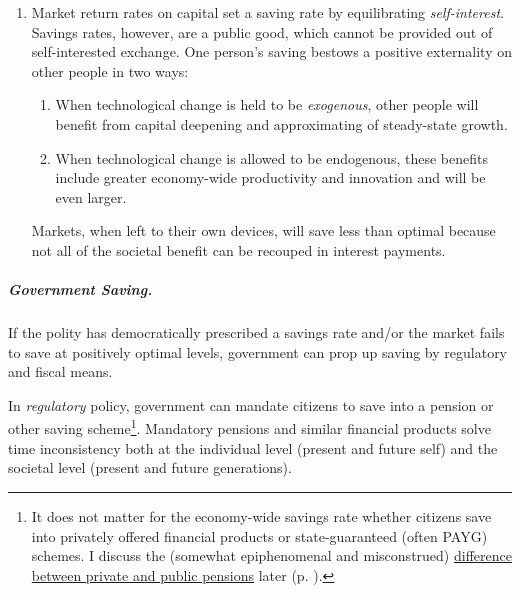 \begin{enumerate}
	\item Market return rates on capital set a saving rate by equilibrating \emph{self-interest}. Savings rates, however, are a public good, which cannot be provided out of self-interested exchange. One person's saving  bestows a positive externality on other people in two ways:

	\begin{enumerate} 
		\item When technological change is held to be \emph{exogenous}, other people will benefit from capital deepening and approximating of steady-state growth. 
		\item When technological change is allowed to be endogenous, these benefits include greater economy-wide productivity and innovation and will be even larger. 
	\end{enumerate} 
	
	Markets, when left to their own devices, will save less than optimal because not all of the societal benefit can be recouped in interest payments. %
\end{enumerate}

\subparagraph{Government Saving.}  \label{sec:government_saves} If the polity has democratically prescribed a savings rate and/or the market fails to save at positively optimal levels, government can prop up saving by regulatory and fiscal means. 

In \emph{regulatory} policy, government can mandate citizens to save into a pension or other saving scheme\footnote{
	It does not matter for the economy-wide savings rate whether citizens save into privately offered financial products or state-guaranteed (often \gls{PAYG}) schemes. I discuss the (somewhat epiphenomenal and misconstrued) \hyperref[sec:pensions]{difference between private and public pensions} later (p. \pageref{sec:pensions}).}. 
Mandatory pensions and similar financial products solve time inconsistency both at the individual level (present and future self) and the societal level (present and future generations). 

